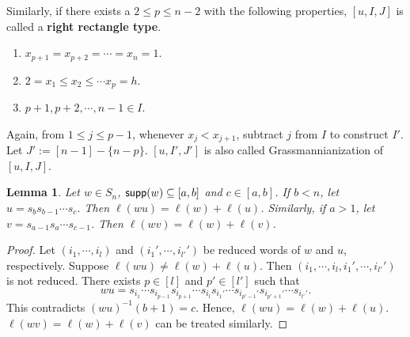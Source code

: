 \documentclass[12pt]{amsart}
\newtheorem{lemma}[theorem]{Lemma}
\theoremstyle{definition}
\theoremstyle{remark}
\begin{document}
Similarly, if there exists a $2 \leq p \leq n-2$ with the following properties, $[u,I,J]$ is called a \textbf{right rectangle type}.
\begin{enumerate}
\item $x_{p+1} = x_{p+2} = \cdots = x_n =1$.
\item $2 = x_1 \leq x_2 \leq \cdots x_{p} = h$.
\item $p+1 , p+2 , \cdots , n-1 \in I$.
\end{enumerate}
Again, from $1 \leq j \leq p-1$, whenever $x_j < x_{j+1}$, subtract $j$ from $I$ to construct $I'$. Let $J':= [n-1] - \{n-p\}$. $[u,I',J']$ is also called Grassmannianization of $[u,I,J]$.

\begin{lemma}\label{lem8.2}
Let $w \in S_n$, ${\sf supp}(w) \subseteq [a, b]$ and $c \in [a, b]$. If $b<n$, let $u = s_{b} s_{b-1} \cdots s_c$. Then $\ell (wu) = \ell (w) + \ell (u)$. Similarly, if $a >1$, let $v = s_{a-1} s_{a} \cdots s_{c-1}$. Then $\ell (wv) = \ell (w) + \ell (v)$.
\end{lemma}

\begin{proof}
Let $(i_1 , \cdots , i_l)$ and $(i_1 ' , \cdots , i_{l'}')$ be reduced words of $w$ and $u$, respectively. Suppose $\ell (wu) \neq \ell (w) + \ell (u)$. Then $(i_1 , \cdots , i_l , i_1' , \cdots , i_{l'}')$ is not reduced. There exists $p \in [l]$ and $p' \in [l']$ such that
\begin{equation}
wu = s_{i_1} \cdots s_{i_{p-1}} s_{i_{p+1}} \cdots s_{i_{l}} s_{i_1'} \cdots s_{i_{p'-1}'} s_{i_{p'+1}'} \cdots s_{i_{l'}'}.
\end{equation}
This contradicts $(wu)^{-1} (b+1) = c$. Hence, $\ell (wu) = \ell (w) + \ell (u)$. $\ell (wv) = \ell (w) + \ell (v)$ can be treated similarly.
\end{proof}
\end{document}
